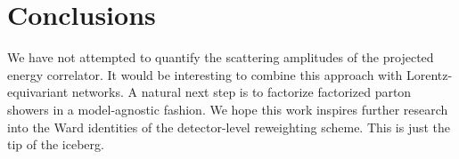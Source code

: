 \section{Conclusions}\label{sec:conclusions}

We have not attempted to quantify the scattering amplitudes of the
projected energy correlator. It would be interesting to combine this
approach with Lorentz-equivariant networks. A natural next step is to
factorize factorized parton showers in a model-agnostic fashion. We hope
this work inspires further research into the Ward identities of the
detector-level reweighting scheme. This is just the tip of the iceberg.

